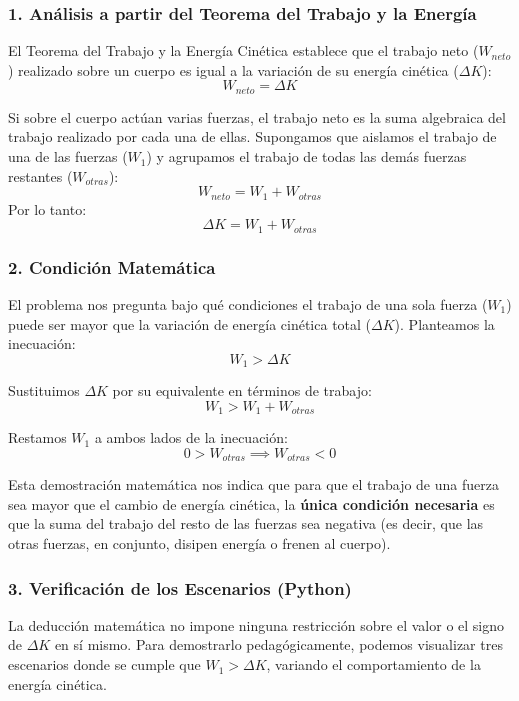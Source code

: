 \documentclass[12pt, a4paper]{article}
\begin{document}
\subsubsection*{1. Análisis a partir del Teorema del Trabajo y la Energía}
El Teorema del Trabajo y la Energía Cinética establece que el trabajo neto ($W_{neto}$) realizado sobre un cuerpo es igual a la variación de su energía cinética ($\Delta K$):
$$W_{neto} = \Delta K$$

Si sobre el cuerpo actúan varias fuerzas, el trabajo neto es la suma algebraica del trabajo realizado por cada una de ellas. Supongamos que aislamos el trabajo de una de las fuerzas ($W_1$) y agrupamos el trabajo de todas las demás fuerzas restantes ($W_{otras}$):
$$W_{neto} = W_1 + W_{otras}$$
Por lo tanto:
$$\Delta K = W_1 + W_{otras}$$

\subsubsection*{2. Condición Matemática}
El problema nos pregunta bajo qué condiciones el trabajo de una sola fuerza ($W_1$) puede ser mayor que la variación de energía cinética total ($\Delta K$). Planteamos la inecuación:
$$W_1 > \Delta K$$

Sustituimos $\Delta K$ por su equivalente en términos de trabajo:
$$W_1 > W_1 + W_{otras}$$

Restamos $W_1$ a ambos lados de la inecuación:
$$0 > W_{otras} \implies W_{otras} < 0$$

Esta demostración matemática nos indica que para que el trabajo de una fuerza sea mayor que el cambio de energía cinética, la \textbf{única condición necesaria} es que la suma del trabajo del resto de las fuerzas sea negativa (es decir, que las otras fuerzas, en conjunto, disipen energía o frenen al cuerpo). 

\subsubsection*{3. Verificación de los Escenarios (Python)}
La deducción matemática no impone ninguna restricción sobre el valor o el signo de $\Delta K$ en sí mismo. Para demostrarlo pedagógicamente, podemos visualizar tres escenarios donde se cumple que $W_1 > \Delta K$, variando el comportamiento de la energía cinética.
\end{document}
